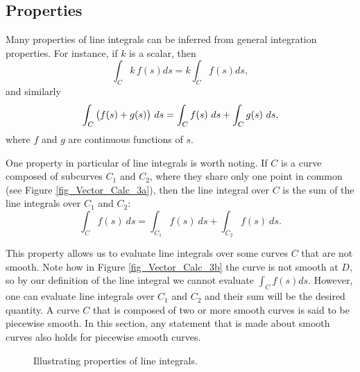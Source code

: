 \subsection{Properties}
Many properties of line integrals can be inferred from general integration properties. For instance, if $k$ is a scalar, then 
$$\int_C k\,f(s)ds = k\int_Cf(s)ds,$$
and similarly
$$\displaystyle \int_C\big(f(s)+g(s)\big)\ ds = \int_Cf(s)\ ds +\int_Cg(s)\ ds,$$
where $f$ and $g$ are continuous functions of $s$.

One property in particular of line integrals is worth noting. If $C$ is a curve composed of subcurves $C_1$ and $C_2$, where they share only one point in common (see Figure \ref{fig_Vector_Calc_3a}), then the line integral over $C$ is the sum of the line integrals over $C_1$ and $C_2$: 
$$\int_Cf(s)\ ds = \int_{C_1}f(s)\ ds+\int_{C_2}f(s)\ ds.$$




This property allows us to evaluate line integrals over some curves $C$ that are not smooth. Note how in Figure \ref{fig_Vector_Calc_3b} the curve is not smooth at $D$, so by our definition of the line integral we cannot evaluate $\int_C f(s)ds$. However, one can evaluate line integrals over $C_1$ and $C_2$ and their sum will be the desired quantity. A curve $C$ that is composed of two or more smooth curves is said to be piecewise smooth. In this section, any statement that is made about smooth curves also holds for piecewise smooth curves.

\begin{figure}[H]
\centering
\qquad
{}
\caption{Illustrating properties of line integrals.}
\end{figure}


